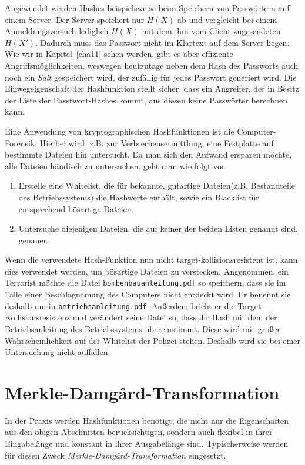 \begin{beispiel}
Angewendet werden Hashes beispielsweise beim Speichern von
Passwörtern auf einem Server. Der Server speichert nur $H(X)$ ab und
vergleicht bei einem Anmeldungsversuch lediglich $H(X)$ mit dem ihm vom
Client zugesendeten $H(X')$. Dadurch muss das Passwort nicht im Klartext
auf dem Server liegen. Wie wir in Kapitel~\ref{cha11} sehen werden, gibt
es aber effiziente Angriffsmöglichkeiten, weswegen heutzutage neben dem
Hash des Passworts auch noch ein \emph{Salt} gespeichert wird, der
zufällig für jedes Passwort generiert wird.
Die Einwegeigenschaft der Hashfunktion stellt sicher, dass ein
Angreifer, der in Besitz der Liste der Passtwort-Hashes kommt, aus
diesen keine Passwörter berechnen kann.
\end{beispiel}

\begin{beispiel}
Eine Anwendung von kryptographischen Hashfunktionen ist die
Computer-Forensik. Hierbei wird, z.B. zur Verbrechensermittlung, eine
Festplatte auf bestimmte Dateien hin untersucht. Da man sich den Aufwand
ersparen möchte, alle Dateien händisch zu untersuchen, geht man wie
folgt vor:
\begin{enumerate}
  \item Erstelle eine Whitelist, die für bekannte, gutartige
    Dateien(z.B. Bestandteile des Betriebssystems) die Hashwerte
    enthält, sowie ein Blacklist für entsprechend bösartige Dateien.
  \item Untersuche diejenigen Dateien, die auf keiner der beiden Listen
    genannt sind, genauer.
\end{enumerate}

Wenn die verwendete Hash-Funktion nun nicht target-kollisionsresistent
ist, kann dies verwendet werden, um bösartige Dateien zu
verstecken. Angenommen, ein Terrorist möchte die Datei
\texttt{bombenbauanleitung.pdf} so speichern, dass sie im Falle einer
Beschlagnamung des Computers nicht entdeckt wird. Er benennt sie deshalb
um in \texttt{betriebsanleitung.pdf}. Außerdem bricht er die
Target-Kollisionsresistenz und verändert seine Datei so, dass ihr Hash
mit dem der Betriebsanleitung des Betriebssystems übereinstimmt. Diese
wird mit großer Wahrscheinlichkeit auf der Whitelist der Polizei
stehen. Deshalb wird sie bei einer Untersuchung nicht
auffallen\cite{Stevens2012}.
\end{beispiel}
\section{Merkle-Damgård-Transformation}
\label{ch:hash:merkledamgard}
In der Praxis werden Hashfunktionen benötigt, die nicht nur die Eigenschaften aus den obigen Abschnitten berücksichtigen, sondern auch flexibel in ihrer
Eingabelänge und konstant in ihrer Ausgabelänge sind. Typischerweise werden für diesen Zweck \emph{Merkle-Damgård-Transformation} eingesetzt. 

